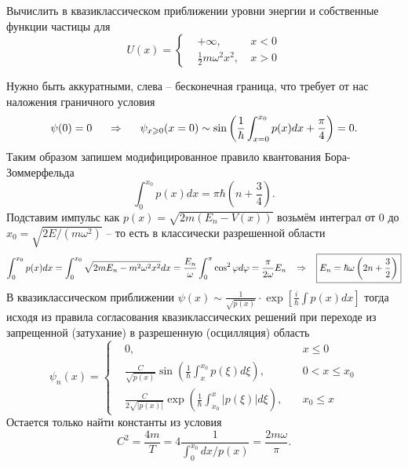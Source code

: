 \begin{leftrules}
	Вычислить в квазиклассическом приближении уровни энергии и собственные функции частицы для
	\begin{equation*}
		U(x) = \left\{
		\begin{aligned}
			&+ \infty, \ &x<0\\
			&\tfrac{1}{2} m \omega^2 x^2, \ &x>0
		\end{aligned}\right.
	\end{equation*}
\end{leftrules}
Нужно быть аккуратными, слева -- бесконечная граница, что требует от нас наложения граничного условия
\begin{equation*}
	\psi(0) = 0 
	\hspace{0.5 cm}
	\Rightarrow
	\hspace{0.5 cm}
	\psi_{x \geq 0}(x=0) \sim \sin\left(\frac{1}{\hbar} \int_{x=0}^{x_0} p(x) d x + \frac{\pi}{4}\right) = 0.
\end{equation*}
Таким образом запишем модифицированное правило квантования Бора-Зоммерфельда
\begin{equation*}
	\int_0^{x_0} p(x) d x = \pi \hbar \left(n + \frac{3}{4}\right).
\end{equation*}
Подставим импульс как $p(x) = \sqrt{2m(E_n - V(x))}$ возьмём интеграл от $0$ до $x_0 = \sqrt{2E/(m \omega^2)}$ -- то есть в классически разрешенной области
\begin{equation*}
	\int_0^{x_0} p(x) d x = \int_0^{x_0} \sqrt{2m E_n -  m^2 \omega^2 x^2} d x = \frac{E_n}{\omega} \int_0^{\pi} \cos^2 \varphi d \varphi = \frac{\pi}{2 \omega} E_n
	\hspace{0.3 cm}
	\Rightarrow
	\hspace{0.3 cm}
	\boxed{E_n = \hbar \omega  \left(2n + \frac{3}{2}\right)}
\end{equation*}
В квазиклассическом приближении $\psi(x) \sim \tfrac{1}{\sqrt{p(x)}} \cdot \exp[\frac{i}{\hbar} \int p(x) dx]$ тогда исходя из правила согласования квазиклассических решений при переходе из запрещенной (затухание) в разрешенную (осцилляция) область 
\begin{equation*}
	\psi_n(x) = \left\{
	\begin{aligned}
		&0, \phantom{\frac{239}{ftsh}} &\ & x\leq 0\\
		&\frac{C}{\sqrt{p(x)}} \sin \left(\frac{1}{\hbar} \int_{x}^{x_0} p(\xi) d\xi\right), &\ & 0<x \leq x_0\\
		&\frac{C}{2\sqrt{|p(x)|}} \exp \left(\frac{1}{\hbar} \int_{x_0}^{x} |p(\xi)| d\xi\right), &\ & x_0 \leq x
	\end{aligned}\right. 
\end{equation*}
Остается только найти константы из условия
\begin{equation*}
	C^2 = \frac{4 m}{T} = 4\frac{1}{\int_{0}^{x_0} dx / p(x)} = \frac{2 m \omega}{\pi}.
\end{equation*}